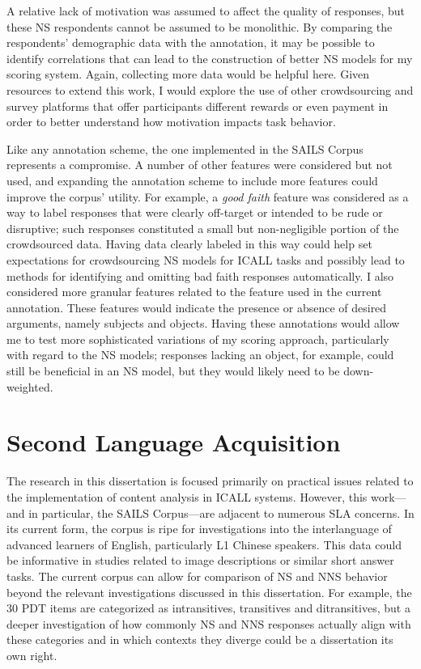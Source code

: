 A relative lack of motivation was assumed to affect the quality of  responses, but these NS respondents cannot be assumed to be monolithic. By comparing the respondents' demographic data with the annotation, it may be possible to identify correlations that can lead to the construction of better NS models for my scoring system. Again, collecting more data would be helpful here. Given resources to extend this work, I would explore the use of other crowdsourcing and survey platforms that offer participants different rewards or even payment in order to better understand how motivation impacts task behavior.

Like any annotation scheme, the one implemented in the SAILS Corpus represents a compromise. A number of other features were considered but not used, and expanding the annotation scheme to include more features could improve the corpus' utility. For example, a \textit{good faith} feature was considered as a way to label responses that were clearly off-target or intended to be rude or disruptive; such responses constituted a small but non-negligible portion of the crowdsourced data. Having data clearly labeled in this way could help set expectations for crowdsourcing NS models for ICALL tasks and possibly lead to methods for identifying and omitting bad faith responses automatically. I also considered more granular features related to the  feature used in the current annotation. These features would indicate the presence or absence of desired arguments, namely subjects and objects. Having these annotations would allow me to test more sophisticated variations of my scoring approach, particularly with regard to the NS models; responses lacking an object, for example, could still be beneficial in an NS model, but they would likely need to be down-weighted.

\section{Second Language Acquisition}
\label{sec:outlook-sla}

The research in this dissertation is focused primarily on practical issues related to the implementation of content analysis in ICALL systems. However, this work---and in particular, the SAILS Corpus---are adjacent to numerous SLA concerns. In its current form, the corpus is ripe for investigations into the interlanguage of advanced learners of English, particularly L1 Chinese speakers. This data could be informative in studies related to image descriptions or similar short answer tasks. The current corpus can allow for comparison of NS and NNS behavior beyond the relevant investigations discussed in this dissertation. For example, the 30 PDT items are categorized as intransitives, transitives and ditransitives, but a deeper investigation of how commonly NS and NNS responses actually align with these categories and in which contexts they diverge could be a dissertation its own right.

